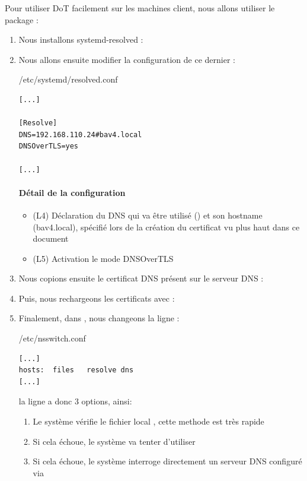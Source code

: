 \documentclass{article}
\begin{document}
Pour utiliser DoT facilement sur les machines client, nous allons utiliser le package  :

\begin{enumerate}
	\item Nous installons systemd-resolved : 
	\item Nous allons ensuite modifier la configuration de ce dernier :
\begin{configbox}{/etc/systemd/resolved.conf}
\begin{lstlisting}
[...]

[Resolve]
DNS=192.168.110.24#bav4.local
DNSOverTLS=yes

[...]
\end{lstlisting}
\end{configbox}
\paragraph{Détail de la configuration}
\begin{itemize}
	\item (L4) Déclaration du DNS qui va être utilisé () et son hostname (bav4.local), spécifié lors de la création du certificat vu plus haut dans ce document
	\item (L5) Activation le mode DNSOverTLS
\end{itemize}
	\item Nous copions ensuite le certificat DNS  présent sur le serveur DNS :
	\item Puis, nous rechargeons les certificats avec : 
	\item Finalement, dans , nous changeons la ligne  :  
\begin{configbox}{/etc/nsswitch.conf}
\begin{lstlisting}
[...]
hosts:	files	resolve	dns
[...]
\end{lstlisting}
\end{configbox}
la ligne  a donc 3 options, ainsi:
\begin{enumerate}
	\item Le système vérifie le fichier local , cette methode est très rapide
	\item Si cela échoue, le système va tenter d'utiliser 
	\item Si cela échoue, le système interroge directement un serveur DNS configuré via 
\end{enumerate}
\end{enumerate}
\end{document}
